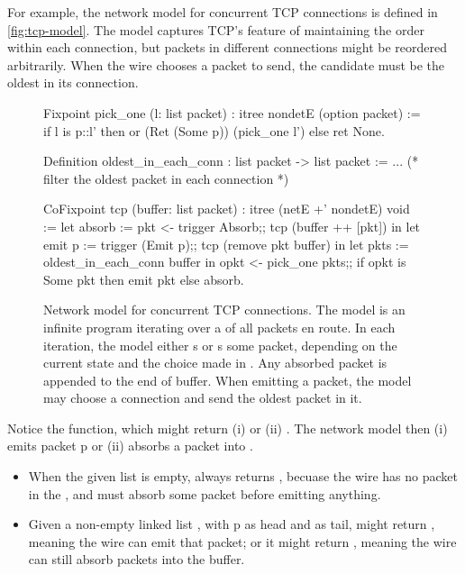 For example, the network model for concurrent TCP connections is defined in
\autoref{fig:tcp-model}.  The model captures TCP's feature of maintaining the
order within each connection, but packets in different connections might be
reordered arbitrarily.  When the wire chooses a packet to send, the candidate
must be the oldest in its connection.

\begin{figure}
\begin{coq}
Fixpoint pick_one (l: list packet) : itree nondetE (option packet) :=
  if l is p::l'
  then or (Ret (Some p)) (pick_one l')
  else ret None.

Definition oldest_in_each_conn : list packet -> list packet := ...
(* filter the oldest packet in each connection *)

CoFixpoint tcp (buffer: list packet) : itree (netE +' nondetE) void :=
  let absorb := pkt <- trigger Absorb;;
                tcp (buffer ++ [pkt])      in
  let emit p := trigger (Emit p);;
                tcp (remove pkt buffer)    in
  let pkts   := oldest_in_each_conn buffer in
  opkt <- pick_one pkts;;
  if opkt is Some pkt
  then emit pkt
  else absorb.
\end{coq}
\caption[Network model for concurrent TCP connections]{Network model for
  concurrent TCP connections.  The model is an infinite program iterating over a
   of all packets en route.  In each iteration, the model either
  s or s some packet, depending on the current
   state and the choice made in .  Any absorbed packet
  is appended to the end of buffer.  When emitting a packet, the model may
  choose a connection and send the oldest packet in it.}
\label{fig:tcp-model}
\end{figure}

Notice the  function, which might return (i)  or (ii)
.    The network model then
(i) emits packet \ilc p or (ii) absorbs a packet into .

\begin{itemize}
\item When the given list  is empty,  always returns
  , becuase the wire has no packet in the , and must
  absorb some packet before emitting anything.
\item Given a non-empty linked list , with \ilc p as head and
   as tail,  might return , meaning the wire
  can emit that packet; or it might return , meaning the wire can
  still absorb packets into the buffer.
\end{itemize}

